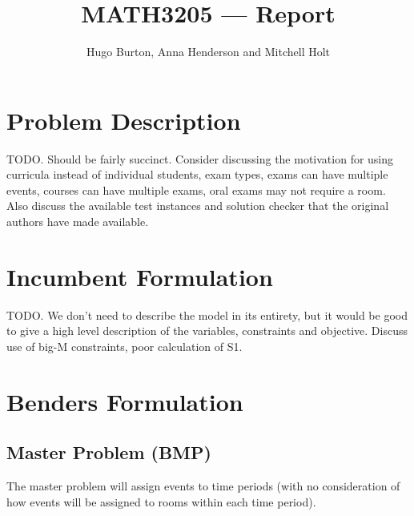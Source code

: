\documentclass{article}
\title{MATH3205 — Report}
\author{Hugo Burton, Anna Henderson and Mitchell Holt}
\theoremstyle{plain}
\numberwithin{theorem}{section}
\numberwithin{example}{section}
\theoremstyle{definition}
\begin{document}
\maketitle

\tableofcontents

\newpage

\section{Problem Description}
TODO. Should be fairly succinct. Consider discussing the motivation for using
curricula instead of individual students, exam types, exams can have multiple
events, courses can have multiple exams, oral exams may not require a room. Also
discuss the available test instances and solution checker that the original
authors have made available.

\section{Incumbent Formulation}
TODO. We don't need to describe the model in its entirety, but it would be good
to give a high level description of the variables, constraints and objective.
Discuss use of big-M constraints, poor calculation of S1.

\section{Benders Formulation}
\subsection{Master Problem (BMP)}
The master problem will assign events to time periods (with no consideration of
how events will be assigned to rooms within each time period).
\end{document}
